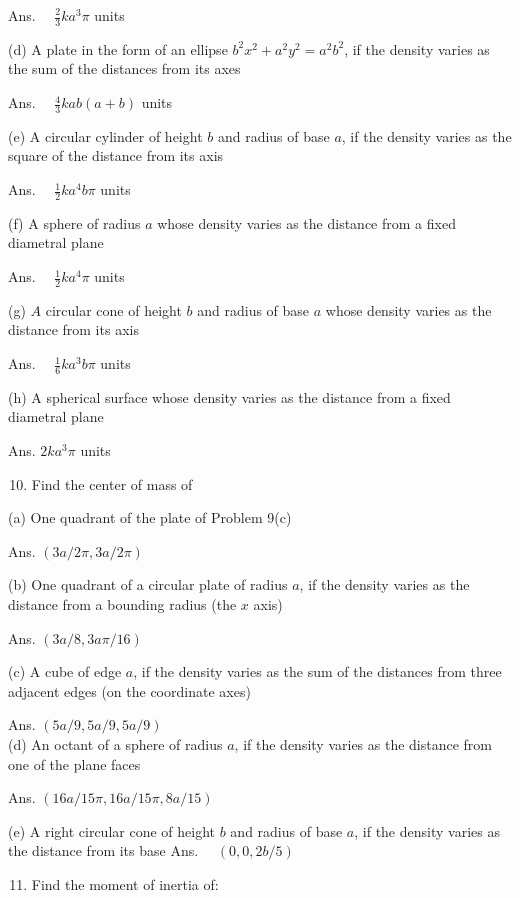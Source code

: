 \documentclass[10pt]{article}
\begin{document}
Ans. $\quad \frac{2}{3} k a^{3} \pi$ units

(d) A plate in the form of an ellipse $b^{2} x^{2}+a^{2} y^{2}=a^{2} b^{2}$, if the density varies as the sum of the distances from its axes

Ans. $\quad \frac{4}{3} k a b(a+b)$ units

(e) A circular cylinder of height $b$ and radius of base $a$, if the density varies as the square of the distance from its axis

Ans. $\quad \frac{1}{2} k a^{4} b \pi$ units

(f) A sphere of radius $a$ whose density varies as the distance from a fixed diametral plane

Ans. $\quad \frac{1}{2} k a^{4} \pi$ units

(g) $A$ circular cone of height $b$ and radius of base $a$ whose density varies as the distance from its axis

Ans. $\quad \frac{1}{6} k a^{3} b \pi$ units

(h) A spherical surface whose density varies as the distance from a fixed diametral plane

Ans. $2 k a^{3} \pi$ units

\begin{enumerate}
  \setcounter{enumi}{9}
  \item Find the center of mass of
\end{enumerate}

(a) One quadrant of the plate of Problem 9(c)

Ans. $(3 a / 2 \pi, 3 a / 2 \pi)$

(b) One quadrant of a circular plate of radius $a$, if the density varies as the distance from a bounding radius (the $x$ axis)

Ans. $(3 a / 8,3 a \pi / 16)$

(c) A cube of edge $a$, if the density varies as the sum of the distances from three adjacent edges (on the coordinate axes)

Ans. $(5 a / 9,5 a / 9,5 a / 9)$\\
(d) An octant of a sphere of radius $a$, if the density varies as the distance from one of the plane faces

Ans. $(16 a / 15 \pi, 16 a / 15 \pi, 8 a / 15)$

(e) A right circular cone of height $b$ and radius of base $a$, if the density varies as the distance from its base Ans. $\quad(0,0,2 b / 5)$

\begin{enumerate}
  \setcounter{enumi}{10}
  \item Find the moment of inertia of:
\end{enumerate}
\end{document}
